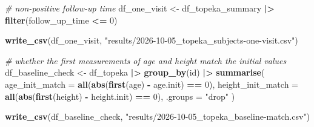 \documentclass[
]{article}
\newenvironment{Shaded}{\begin{snugshade}}{\end{snugshade}}
\newcommand{\AttributeTok}[1]{\textcolor[rgb]{0.13,0.29,0.53}{#1}}
\newcommand{\CommentTok}[1]{\textcolor[rgb]{0.56,0.35,0.01}{\textit{#1}}}
\newcommand{\DecValTok}[1]{\textcolor[rgb]{0.00,0.00,0.81}{#1}}
\newcommand{\FunctionTok}[1]{\textcolor[rgb]{0.13,0.29,0.53}{\textbf{#1}}}
\newcommand{\NormalTok}[1]{#1}
\newcommand{\OtherTok}[1]{\textcolor[rgb]{0.56,0.35,0.01}{#1}}
\newcommand{\SpecialCharTok}[1]{\textcolor[rgb]{0.81,0.36,0.00}{\textbf{#1}}}
\newcommand{\StringTok}[1]{\textcolor[rgb]{0.31,0.60,0.02}{#1}}
\begin{document}
\begin{Shaded}
\begin{Highlighting}[]
\CommentTok{\# non{-}positive follow{-}up time}
\NormalTok{df\_one\_visit }\OtherTok{\textless{}{-}} 
\NormalTok{  df\_topeka\_summary }\SpecialCharTok{|\textgreater{}}
  \FunctionTok{filter}\NormalTok{(follow\_up\_time }\SpecialCharTok{\textless{}=} \DecValTok{0}\NormalTok{)}

\FunctionTok{write\_csv}\NormalTok{(df\_one\_visit, }\StringTok{"results/2026{-}10{-}05\_topeka\_subjects{-}one{-}visit.csv"}\NormalTok{)}

\CommentTok{\# whether the first measurements of age and height match the initial values }
\NormalTok{df\_baseline\_check }\OtherTok{\textless{}{-}} 
\NormalTok{  df\_topeka }\SpecialCharTok{|\textgreater{}}
  \FunctionTok{group\_by}\NormalTok{(id) }\SpecialCharTok{|\textgreater{}}
  \FunctionTok{summarise}\NormalTok{(}
    \AttributeTok{age\_init\_match =} \FunctionTok{all}\NormalTok{(}\FunctionTok{abs}\NormalTok{(}\FunctionTok{first}\NormalTok{(age) }\SpecialCharTok{{-}}\NormalTok{ age.init) }\SpecialCharTok{==} \DecValTok{0}\NormalTok{),}
    \AttributeTok{height\_init\_match =} \FunctionTok{all}\NormalTok{(}\FunctionTok{abs}\NormalTok{(}\FunctionTok{first}\NormalTok{(height) }\SpecialCharTok{{-}}\NormalTok{ height.init) }\SpecialCharTok{==} \DecValTok{0}\NormalTok{),}
    \AttributeTok{.groups =} \StringTok{"drop"}
\NormalTok{  )}

\FunctionTok{write\_csv}\NormalTok{(df\_baseline\_check, }\StringTok{"results/2026{-}10{-}05\_topeka\_baseline{-}match.csv"}\NormalTok{)}
\end{Highlighting}
\end{Shaded}
\end{document}
